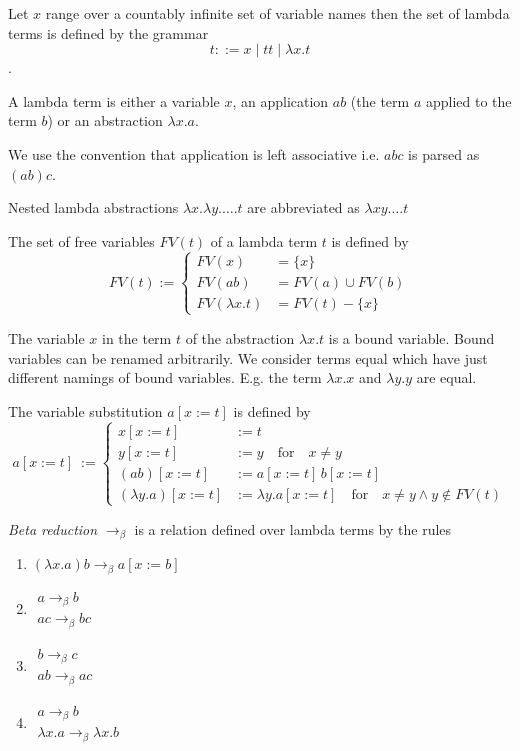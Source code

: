 \documentclass{article}
\newcommand{\tobeta}{\to_\beta}
\newcommand{\rulev}[2]{\begin{array}{l} #1 \\ \hline #2\end{array}}
\begin{document}
\begin{definition}
  Let $x$ range over a countably infinite set of variable names then the set
  of lambda terms is defined by the grammar $$t ::= x \mid t t \mid \lambda x. t$$.
\end{definition}

A lambda term is either a variable $x$, an application $a b$ (the term $a$
applied to the term $b$) or an abstraction $\lambda x.a$.

We use the convention that application is left associative i.e. $a b c$ is
parsed as $(a b) c$.

Nested lambda abstractions $\lambda x. \lambda y. \ldots . t$ are abbreviated
as $\lambda x y \ldots . t$

\begin{definition}
  The set of free variables $FV(t)$ of a lambda term $t$ is defined by
  $$FV(t) :=
  \begin{cases} FV(x) &= \{x\} \\
     FV(a b) &= FV(a) \cup FV(b) \\
     FV(\lambda x. t) &= FV(t) - \{x\}
   \end{cases}
   $$
\end{definition}

The variable $x$ in the term $t$ of the abstraction $\lambda x.t$ is a bound
variable. Bound variables can be renamed arbitrarily. We consider terms equal
which have just different namings of bound variables. E.g. the term $\lambda
x.x$ and $\lambda y.y$ are equal.

\begin{definition}
  The variable substitution $a[x:=t]$ is defined by
  $$a[x:=t]~:=
  \begin{cases} x[x:=t]  &:= t \\
    y[x:=t] &:= y \quad \text{for}\quad x \ne y \\
    (a b)[x:=t] &:= a[x:=t] \, b[x:=t] \\
    (\lambda y.a)[x:=t]  &:= \lambda y. a[x:=t] \quad\text{for}\quad x \ne y
    \land y \notin FV(t)
   \end{cases}
   $$
\end{definition}

\begin{definition} \emph{Beta reduction} $\tobeta$ is a relation defined over lambda
  terms by the rules
  \begin{enumerate}
  \item $(\lambda x.a) b \tobeta a[x := b]$
  \item $\rulev{a\tobeta b}{a c \tobeta b c}$
  \item $\rulev{b\tobeta c}{a b \tobeta a c}$
  \item $\rulev{a \tobeta b}{\lambda x.a \tobeta \lambda x.b}$
  \end{enumerate}
\end{definition}
\end{document}
